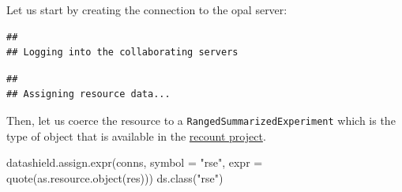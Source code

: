 \documentclass[
]{book}
\newenvironment{Shaded}{\begin{snugshade}}{\end{snugshade}}
\newcommand{\AttributeTok}[1]{\textcolor[rgb]{0.77,0.63,0.00}{#1}}
\newcommand{\ConstantTok}[1]{\textcolor[rgb]{0.00,0.00,0.00}{#1}}
\newcommand{\FunctionTok}[1]{\textcolor[rgb]{0.00,0.00,0.00}{#1}}
\newcommand{\NormalTok}[1]{#1}
\newcommand{\OtherTok}[1]{\textcolor[rgb]{0.56,0.35,0.01}{#1}}
\newcommand{\SpecialCharTok}[1]{\textcolor[rgb]{0.00,0.00,0.00}{#1}}
\newcommand{\StringTok}[1]{\textcolor[rgb]{0.31,0.60,0.02}{#1}}
\begin{document}
Let us start by creating the connection to the opal server:

\begin{Shaded}
\end{Shaded}

\begin{verbatim}
## 
## Logging into the collaborating servers
\end{verbatim}

\begin{verbatim}
## 
## Assigning resource data...
\end{verbatim}

Then, let us coerce the resource to a \texttt{RangedSummarizedExperiment} which is the type of object that is available in the \href{https://jhubiostatistics.shinyapps.io/recount/}{recount project}.

\begin{Shaded}
\begin{Highlighting}[]
\FunctionTok{datashield.assign.expr}\NormalTok{(conns, }\AttributeTok{symbol =} \StringTok{"rse"}\NormalTok{, }
                       \AttributeTok{expr =} \FunctionTok{quote}\NormalTok{(}\FunctionTok{as.resource.object}\NormalTok{(res)))}
\FunctionTok{ds.class}\NormalTok{(}\StringTok{"rse"}\NormalTok{)}
\end{Highlighting}
\end{Shaded}
\end{document}
